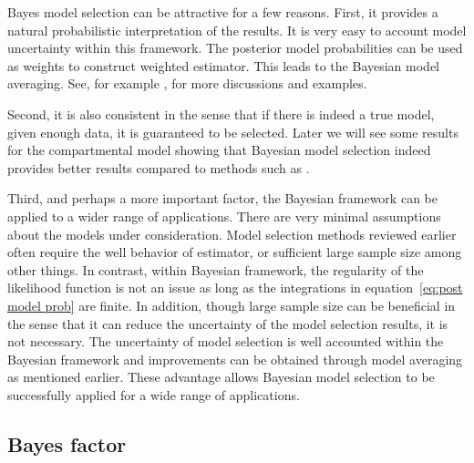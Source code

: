 Bayes model selection can be attractive for a few reasons. First, it provides
a natural probabilistic interpretation of the results. It is very easy to
account model uncertainty within this framework. The posterior model
probabilities can be used as weights to construct weighted estimator. This
leads to the Bayesian model averaging. See, for example
\cite{Raftery:1997vx,Clyde:1999vx,Draper:1995vx}, for more discussions and
examples.

Second, it is also consistent in the sense that if there is indeed a true
model, given enough data, it is guaranteed to be selected. Later we will see
some results for the \pet compartmental model showing that Bayesian model
selection indeed provides better results compared to methods such as \aic.

Third, and perhaps a more important factor, the Bayesian framework can be
applied to a wider range of applications. There are very minimal assumptions
about the models under consideration. Model selection methods reviewed earlier
often require the well behavior of estimator, or sufficient large sample size
among other things. In contrast, within Bayesian framework, the regularity of
the likelihood function is not an issue as long as the integrations in
equation~\ref{eq:post model prob} are finite. In addition, though large sample
size can be beneficial in the sense that it can reduce the uncertainty of the
model selection results, it is not necessary. The uncertainty of model
selection is well accounted within the Bayesian framework and improvements can
be obtained through model averaging as mentioned earlier. These advantage
allows Bayesian model selection to be successfully applied for a wide range of
applications.

\subsection{Bayes factor}
\label{sub:Bayes factor}

